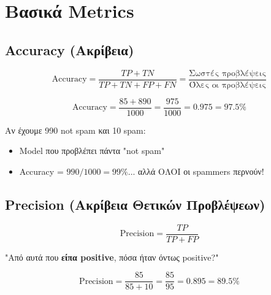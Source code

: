 \section{Βασικά Metrics}

\subsection{Accuracy (Ακρίβεια)}

\begin{formulabox}[Accuracy]
\begin{equation}
\text{Accuracy} = \frac{TP + TN}{TP + TN + FP + FN} = \frac{\text{Σωστές προβλέψεις}}{\text{Όλες οι προβλέψεις}}
\end{equation}
\end{formulabox}

\begin{examplebox}
\[
\text{Accuracy} = \frac{85 + 890}{1000} = \frac{975}{1000} = 0.975 = 97.5\%
\]
\end{examplebox}

\begin{warningbox}
Αν έχουμε 990 not spam και 10 spam:
\begin{itemize}
    \item Model που προβλέπει πάντα "not spam"
    \item Accuracy = $990/1000 = 99\%$... αλλά ΟΛΟΙ οι spammers περνούν!
\end{itemize}
\end{warningbox}

\subsection{Precision (Ακρίβεια Θετικών Προβλέψεων)}

\begin{formulabox}[Precision]
\begin{equation}
\text{Precision} = \frac{TP}{TP + FP}
\end{equation}

"Από αυτά που \textbf{είπα positive}, πόσα ήταν όντως positive?"
\end{formulabox}

\begin{examplebox}
\[
\text{Precision} = \frac{85}{85 + 10} = \frac{85}{95} = 0.895 = 89.5\%
\]
\end{examplebox}

